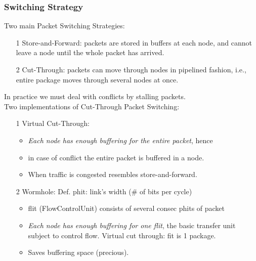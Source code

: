 \documentclass{beamer}
\renewcommand{\emph}[1]{\textcolor{structure}{#1}}
\newcommand{\emp}[1]{\textcolor{DikuRed}{ #1}}
\begin{document}
\begin{frame}[fragile,t]
\frametitle{Switching Strategy}

\emph{Two main Packet Switching Strategies:}
\begin{itemize}
    \item[1] \emp{Store-and-Forward:} packets are stored in buffers at each node,
            and cannot leave a node until the whole packet has arrived.\smallskip

    \item[2] \emp{Cut-Through:} packets can move through nodes in pipelined fashion, 
                i.e., entire package moves through several nodes at once.
\end{itemize}
\medskip

In practice we must deal with conflicts by stalling packets.\\
\emph{Two implementations of Cut-Through Packet Switching}:\smallskip
\begin{itemize}
    \item[1] \emp{Virtual Cut-Through:} 
        \begin{itemize}
            \item {\em Each node has enough buffering for the entire packet}, hence
            \item in case of conflict the entire packet is buffered in a node.
            \item When traffic is congested resembles store-and-forward.
        \end  {itemize}\smallskip

    \item[2] \emp{Wormhole:} Def. {\sc phit}: link's width (\# of bits per cycle) 
        \begin{itemize}
            \item {\sc flit} (FlowControlUnit) consists of several consec
                    {\sc phits} of packet%
            \item {\em Each node has enough buffering for one {\sc flit}}, the basic 
                    transfer unit subject to control flow. Virtual cut through: 
                    {\sc fit} is 1 package.
            \item Saves buffering space (precious).
        \end  {itemize}
\end  {itemize}

\end{frame}
\end{document}
